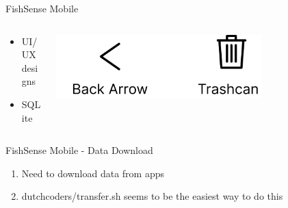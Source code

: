 \begin{frame}{FishSense Mobile}
    \begin{columns}
        \begin{column}{0.5\textwidth}
            \begin{itemize}
                \item UI/UX designs
                \item SQLite
            \end{itemize}
        \end{column}
        \begin{column}{0.5\textwidth}
            \centering
            \includegraphics[height=0.7\textheight,width=0.7\textwidth,keepaspectratio]{images/fs_icons.png}
        \end{column}
    \end{columns}
\end{frame}

\begin{frame}{FishSense Mobile - Data Download}
    \begin{enumerate}
        \item Need to download data from apps
        \item dutchcoders/transfer.sh seems to be the easiest way to do this
    \end{enumerate}
\end{frame}




